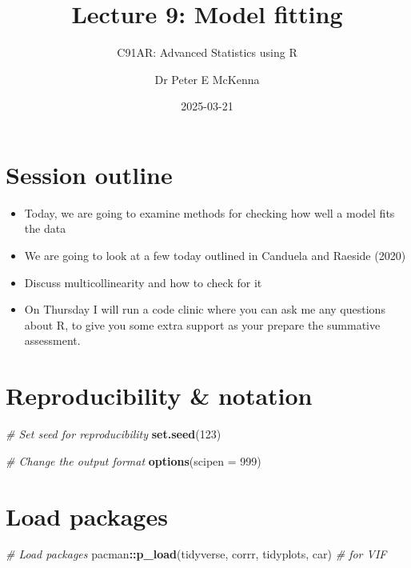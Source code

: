 \documentclass[
]{article}
\title{Lecture 9: Model fitting}
\subtitle{C91AR: Advanced Statistics using R}
\author{Dr Peter E McKenna}
\date{2025-03-21}
\newenvironment{Shaded}{\begin{snugshade}}{\end{snugshade}}
\newcommand{\AttributeTok}[1]{\textcolor[rgb]{0.13,0.29,0.53}{#1}}
\newcommand{\CommentTok}[1]{\textcolor[rgb]{0.56,0.35,0.01}{\textit{#1}}}
\newcommand{\DecValTok}[1]{\textcolor[rgb]{0.00,0.00,0.81}{#1}}
\newcommand{\FunctionTok}[1]{\textcolor[rgb]{0.13,0.29,0.53}{\textbf{#1}}}
\newcommand{\NormalTok}[1]{#1}
\newcommand{\SpecialCharTok}[1]{\textcolor[rgb]{0.81,0.36,0.00}{\textbf{#1}}}
\providecommand{\tightlist}{%
  \setlength{\itemsep}{0pt}\setlength{\parskip}{0pt}}
\begin{document}
\maketitle

{
\setcounter{tocdepth}{2}
\tableofcontents
}
\hypertarget{session-outline}{%
\section{Session outline}\label{session-outline}}

\begin{itemize}
\tightlist
\item
  Today, we are going to examine methods for checking how well a model
  fits the data
\item
  We are going to look at a few today outlined in Canduela and Raeside
  (2020)
\item
  Discuss multicollinearity and how to check for it
\item
  On Thursday I will run a code clinic where you can ask me any
  questions about R, to give you some extra support as your prepare the
  summative assessment.
\end{itemize}

\hypertarget{reproducibility-notation}{%
\section{Reproducibility \& notation}\label{reproducibility-notation}}

\begin{Shaded}
\begin{Highlighting}[]
\CommentTok{\# Set seed for reproducibility}
\FunctionTok{set.seed}\NormalTok{(}\DecValTok{123}\NormalTok{)}

\CommentTok{\# Change the output format}
\FunctionTok{options}\NormalTok{(}\AttributeTok{scipen =} \DecValTok{999}\NormalTok{)}
\end{Highlighting}
\end{Shaded}

\hypertarget{load-packages}{%
\section{Load packages}\label{load-packages}}

\begin{Shaded}
\begin{Highlighting}[]
\CommentTok{\# Load packages}
\NormalTok{pacman}\SpecialCharTok{::}\FunctionTok{p\_load}\NormalTok{(tidyverse,}
\NormalTok{               corrr,}
\NormalTok{               tidyplots,}
\NormalTok{               car) }\CommentTok{\# for VIF}
\end{Highlighting}
\end{Shaded}
\end{document}
